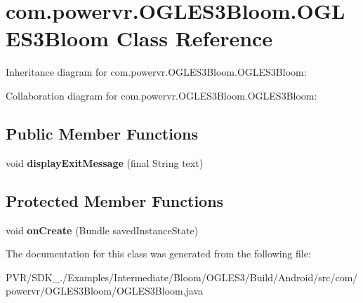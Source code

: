 \hypertarget{classcom_1_1powervr_1_1_o_g_l_e_s3_bloom_1_1_o_g_l_e_s3_bloom}{\section{com.\+powervr.\+O\+G\+L\+E\+S3\+Bloom.\+O\+G\+L\+E\+S3\+Bloom Class Reference}
\label{classcom_1_1powervr_1_1_o_g_l_e_s3_bloom_1_1_o_g_l_e_s3_bloom}
}


Inheritance diagram for com.\+powervr.\+O\+G\+L\+E\+S3\+Bloom.\+O\+G\+L\+E\+S3\+Bloom\+:


Collaboration diagram for com.\+powervr.\+O\+G\+L\+E\+S3\+Bloom.\+O\+G\+L\+E\+S3\+Bloom\+:
\subsection*{Public Member Functions}
\begin{DoxyCompactItemize}
\item 
\hypertarget{classcom_1_1powervr_1_1_o_g_l_e_s3_bloom_1_1_o_g_l_e_s3_bloom_a9243e718daae4b5678087f1609545847}{void {\bfseries display\+Exit\+Message} (final String text)}\label{classcom_1_1powervr_1_1_o_g_l_e_s3_bloom_1_1_o_g_l_e_s3_bloom_a9243e718daae4b5678087f1609545847}

\end{DoxyCompactItemize}
\subsection*{Protected Member Functions}
\begin{DoxyCompactItemize}
\item 
\hypertarget{classcom_1_1powervr_1_1_o_g_l_e_s3_bloom_1_1_o_g_l_e_s3_bloom_ae7a55407f49ecccd2f663d45def1c6f5}{void {\bfseries on\+Create} (Bundle saved\+Instance\+State)}\label{classcom_1_1powervr_1_1_o_g_l_e_s3_bloom_1_1_o_g_l_e_s3_bloom_ae7a55407f49ecccd2f663d45def1c6f5}

\end{DoxyCompactItemize}


The documentation for this class was generated from the following file\+:\begin{DoxyCompactItemize}
\item 
P\+V\+R/\+S\+D\+K\+\_./\+Examples/\+Intermediate/\+Bloom/\+O\+G\+L\+E\+S3/\+Build/\+Android/src/com/powervr/\+O\+G\+L\+E\+S3\+Bloom/O\+G\+L\+E\+S3\+Bloom.\+java\end{DoxyCompactItemize}
